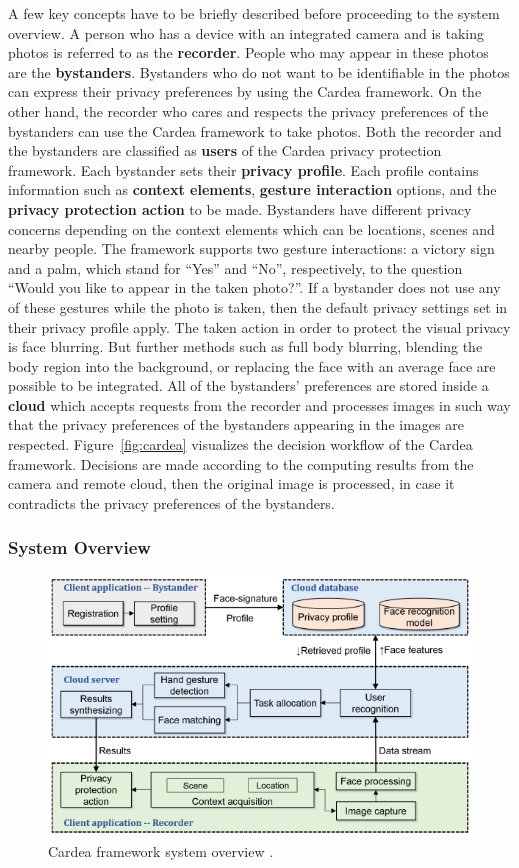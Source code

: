 \documentclass[conference]{IEEEtran}
\begin{document}
A few key concepts have to be briefly described before proceeding to the system overview. A person who has a device with an integrated camera and is taking photos is referred to as the \textbf{recorder}. People who may appear in these photos are the \textbf{bystanders}. Bystanders who do not want to be identifiable in the photos can express their privacy preferences by using the Cardea framework. On the other hand, the recorder who cares and respects the privacy preferences of the bystanders can use the Cardea framework to take photos. Both the recorder and the bystanders are classified as \textbf{users} of the Cardea privacy protection framework. Each bystander sets their \textbf{privacy profile}. Each profile contains information such as \textbf{context elements}, \textbf{gesture interaction} options, and the \textbf{privacy protection action} to be made. Bystanders have different privacy concerns depending on the context elements which can be locations, scenes and nearby people. The framework supports two gesture interactions: a victory sign and a palm, which stand for “Yes” and “No”, respectively, to the question “Would you like to appear in the taken photo?”. If a bystander does not use any of these gestures while the photo is taken, then the default privacy settings set in their privacy profile apply. The taken action in order to protect the visual privacy is face blurring. But further methods such as full body blurring, blending the body region into the background, or replacing the face with an average face are possible to be integrated. All of the bystanders' preferences are stored inside a \textbf{cloud} which accepts requests from the recorder and processes images in such way that the privacy preferences of the bystanders appearing in the images are respected. Figure~\ref{fig:cardea} visualizes the decision workflow of the Cardea framework. Decisions are made according to the computing results from the camera and remote cloud, then the original image is processed, in case it contradicts the privacy preferences of the bystanders. 

\subsubsection{System Overview}
\begin{figure}[t]
\centerline{\includegraphics[width=.5\textwidth]{img/cardea_overview_diagram.png}}
\caption{Cardea framework system overview \cite{shu2016cardea}.}
\label{fig:cardea2}
\end{figure}
\end{document}
